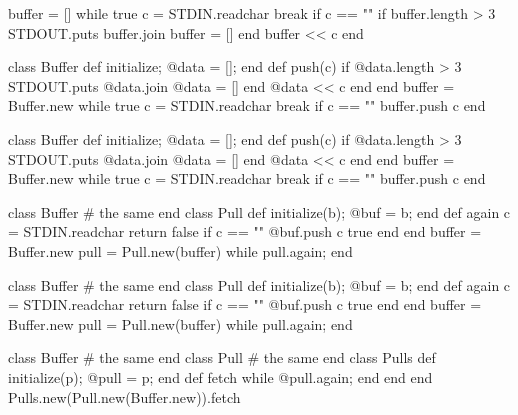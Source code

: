 \documentclass{article}
\begin{document}
\begin{lnSnippet}
buffer = []
while true
  c = STDIN.readchar
  break if c == "\n"
  if buffer.length > 3
    STDOUT.puts buffer.join
    buffer = []
  end
  buffer << c
end
\end{lnSnippet}
\begin{lnSnippet}
class Buffer
  def initialize; @data = []; end
  def push(c)
    if @data.length > 3
      STDOUT.puts @data.join
      @data = []
    end
    @data << c
  end
end
buffer = Buffer.new
while true
  c = STDIN.readchar
  break if c == "\n"
  buffer.push c
end
\end{lnSnippet}

\begin{lnSnippet}
class Buffer
  def initialize; @data = []; end
  def push(c)
    if @data.length > 3
      STDOUT.puts @data.join
      @data = []
    end
    @data << c
  end
end
buffer = Buffer.new
while true
  c = STDIN.readchar
  break if c == "\n"
  buffer.push c
end
\end{lnSnippet}
\begin{lnSnippet}
class Buffer
  # the same
end
class Pull
  def initialize(b); @buf = b; end
  def again
    c = STDIN.readchar
    return false if c == "\n"
    @buf.push c
    true
  end
end
buffer = Buffer.new
pull = Pull.new(buffer)
while pull.again; end
\end{lnSnippet}

\begin{lnSnippet}
class Buffer
  # the same
end
class Pull
  def initialize(b); @buf = b; end
  def again
    c = STDIN.readchar
    return false if c == "\n"
    @buf.push c
    true
  end
end
buffer = Buffer.new
pull = Pull.new(buffer)
while pull.again; end
\end{lnSnippet}
\begin{lnSnippet}
class Buffer
  # the same
end
class Pull
  # the same
end
class Pulls
  def initialize(p); @pull = p; end
  def fetch
    while @pull.again; end
  end
end
Pulls.new(Pull.new(Buffer.new)).fetch
\end{lnSnippet}
\end{document}
